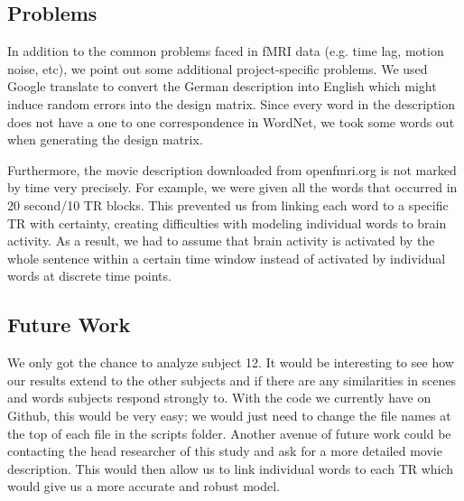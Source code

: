 \subsection{Problems}
\par
In addition to the common problems faced in fMRI data (e.g. time lag, motion noise, etc), we point out some additional project-specific problems. We used Google translate to convert the German description into English which might induce random errors into the design matrix. Since every word in the description does not have a one to one correspondence in WordNet, we took some words out when generating the design matrix.

Furthermore, the movie description downloaded from openfmri.org is not marked by time very precisely. For example, we were given all the words that occurred in 20 second/10 TR blocks. This prevented us from linking each word to a specific TR with certainty, creating difficulties with modeling individual words to brain activity. As a result, we had to assume that brain activity is activated by the whole sentence within a certain time window instead of activated by individual words at discrete time points.

\subsection{Future Work}
\par We only got the chance to analyze subject 12. It would be interesting to see how our results extend to the other subjects and if there are any similarities in scenes and words subjects respond strongly to. With the code we currently have on Github, this would be very easy; we would just need to change the file names at the top of each file in the scripts folder. Another avenue of future work could be contacting the head researcher of this study and ask for a more detailed movie description. This would then allow us to link individual words to each TR which would give us a more accurate and robust model. 

